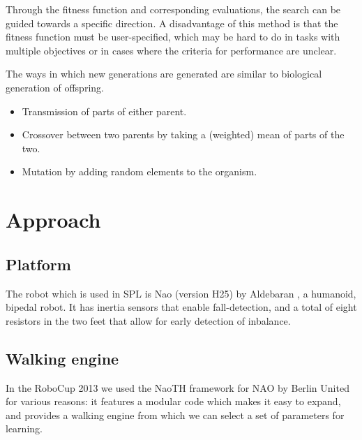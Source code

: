 \documentclass[a4paper, twocolumn]{article}
\begin{document}
Through the fitness function and corresponding evaluations, the search can be guided towards a specific direction. A disadvantage of this method is that the fitness function must be user-specified, which may be hard to do in tasks with multiple objectives or in cases where the criteria for performance are unclear. 

The ways in which new generations are generated are similar to biological generation of offspring.  
\begin{itemize} 
\item Transmission of parts of either parent.
\item Crossover between two parents by taking a (weighted) mean of parts of the two.
\item Mutation by adding random elements to the organism.
\end{itemize}


\section{Approach}
\subsection{Platform}
The robot which is used in SPL is Nao (version H25) by Aldebaran \citep{gouaillier2009mechatronic}, a humanoid, bipedal robot. It has inertia sensors that enable fall-detection, and a total of eight resistors in the two feet that allow for early detection of inbalance. 

\subsection{Walking engine}
In the RoboCup 2013 we used the NaoTH framework for NAO by Berlin United
\citep{naothdescription} for various reasons: it features a modular code which
makes it easy to expand, and provides a walking engine from which we can select
a set of parameters for learning. 
\end{document}
